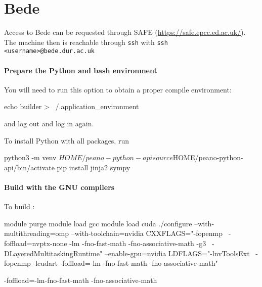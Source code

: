 


\section{Bede}


Access to Bede can be requested through SAFE
(\url{https://safe.epcc.ed.ac.uk/}).
The machine then is reachable through \texttt{ssh} with \texttt{ssh
<username>@bede.dur.ac.uk}


\paragraph{Prepare the Python and bash environment}

You will need to run this option to obtain a proper compile environment:
\begin{code}
echo builder > ~/.application_environment
\end{code}
and log out and log in again.


To install Python with all packages, run
\begin{code}
python3 -m venv $HOME/peano-python-api
source $HOME/peano-python-api/bin/activate
pip install jinja2 sympy
\end{code}


\paragraph{Build with the GNU compilers}



To build \Peano:
\begin{code}
module purge
module load gcc
module load cuda
./configure --with-multithreading=omp --with-toolchain=nvidia CXXFLAGS="-fopenmp \ 
  -foffload=nvptx-none -lm -fno-fast-math -fno-associative-math -g3 \
  -DLayeredMultitaskingRuntime" --enable-gpu=nvidia  LDFLAGS="-lnvToolsExt \
  -fopenmp -lcudart -foffload=-lm -fno-fast-math -fno-associative-math"
\end{code}


-foffload=-lm-fno-fast-math -fno-associative-math



